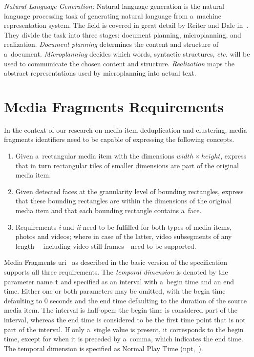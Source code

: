 \documentclass{article}
\begin{document}
\noindent \textit{Natural Language Generation:}
Natural language generation is the natural language processing task
of generating natural language from a~machine representation system.
The field is covered in great detail
by Reiter and Dale in~\cite{reiter2000building}.
They divide the task into three stages:
document planning, microplanning, and realization.
\emph{Document planning} determines the content and structure of a~document.
\emph{Microplanning} decides which words, syntactic structures, \emph{etc.}
will be used to communicate the chosen content and structure.
\emph{Realization} maps the abstract representations
used by microplanning into actual text.

\section{Media Fragments Requirements}
\label{sec:media-fragment-requirements}

In the context of our research on media item deduplication and clustering,
media fragments identifiers need to be capable of expressing the following concepts.

\begin{enumerate}[i]
  \itemsep0em 
  \item Given a~rectangular media item with the dimensions $ width \times height $,
    express that in turn rectangular tiles
    of smaller dimensions are part of the original media item.
  \item Given detected faces at the granularity level of bounding rectangles,
    express that these bounding rectangles are within the dimensions
    of the original media item and that each bounding rectangle contains a~face.
  \item Requirements \textit{i} and \textit{ii} need to be fulfilled for both
    types of media items, photos and videos;
    where in case of the latter, video subsegments of any length---%
    including video still frames---need to be supported.
\end{enumerate}

Media Fragments {\sc uri}~\cite{troncy2012mediafragments} as described in
the basic version of the specification supports all three requirements.
The \emph{temporal dimension} is denoted by the parameter name \texttt{t}
and specified as an interval with a~begin time and an end time.
Either one or both parameters may be omitted,
with the begin time defaulting to 0 seconds
and the end time defaulting to the duration of the source media item.
The interval is half-open: the begin time is considered part of the interval,
whereas the end time is considered to be the first time point
that is not part of the interval.
If only a~single value is present, it corresponds to the begin time,
except for when it is preceded by a~comma, which indicates the end time.
The temporal dimension is specified as Normal Play Time ({\sc npt},~\cite{schulzrinne1998realtime}).
\end{document}
